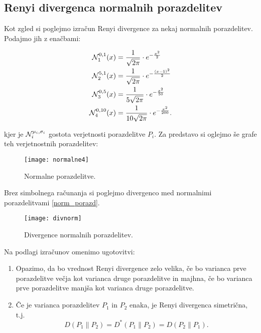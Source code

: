 \subsection{Renyi divergenca normalnih porazdelitev}

Kot zgled si poglejmo izračun Renyi divergence za nekaj normalnih porazdelitev. Podajmo jih z enačbami:

\begin{equation}\label{norm_porazd}
	\begin{aligned}
		\mathcal{N}_1^{0,1}(x) &= \frac{1}{\sqrt{2\pi}}\cdot e^{-\frac{x^2}{2}} \\
		\mathcal{N}_2^{5,1}(x) &= \frac{1}{\sqrt{2\pi}}\cdot e^{-\frac{(x-5)^2}{2}} \\
		\mathcal{N}_3^{0,5}(x) &= \frac{1}{5\sqrt{2\pi}}\cdot e^{-\frac{x^2}{50}} \\
		\mathcal{N}_4^{0,10}(x) &= \frac{1}{10\sqrt{2\pi}}\cdot e^{-\frac{x^2}{200}}.
	\end{aligned}
\end{equation}

kjer je $\mathcal{N}_i^{\mu_i, \sigma_i}$ gostota verjetnosti porazdelitve $P_i$. Za predstavo si oglejmo še grafe teh verjetnostnih porazdelitev:

\begin{figure}[!ht]
	\centering
	\texttt{[image: normalne4]}
	\caption{Normalne porazdelitve.}
\end{figure}

Brez simbolnega računanja si poglejmo divergenco med normalnimi porazdelitvami \eqref{norm_porazd}.

\begin{figure}[!ht]
	\texttt{[image: divnorm]}
	\caption{Divergence normalnih porazdelitev.}
	\label{divergence}
\end{figure}
\pagebreak
Na podlagi izračunov omenimo ugotovitvi:
\begin{enumerate}
	\item Opazimo, da bo vrednost Renyi divergence zelo velika, če bo varianca prve porazdelitve večja kot varianca druge porazdelitve in majhna, če bo varianca prve porazdelitve manjša kot varianca druge porazdelitve.
	\item Če je varianca porazdelitev $P_1$ in $P_2$ enaka, je Renyi divergenca simetrična, t.j. 
	\begin{equation*}
		D(P_1 \| P_2) = D^{\ast}(P_1 \| P_2) = D(P_2 \| P_1).
	\end{equation*}
\end{enumerate}

